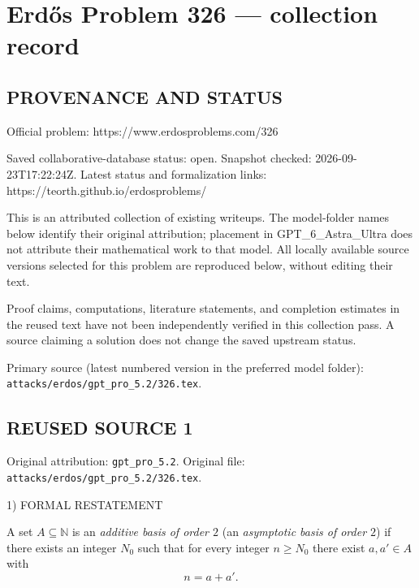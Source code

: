 \section*{Erd\H{o}s Problem 326 --- collection record}

\subsection*{PROVENANCE AND STATUS}
Official problem: https://www.erdosproblems.com/326

Saved collaborative-database status: open.
Snapshot checked: 2026-09-23T17:22:24Z.
Latest status and formalization links: https://teorth.github.io/erdosproblems/

This is an attributed collection of existing writeups. The model-folder names below identify their original attribution; placement in GPT\_6\_Astra\_Ultra does not attribute their mathematical work to that model. All locally available source versions selected for this problem are reproduced below, without editing their text.

Proof claims, computations, literature statements, and completion estimates in the reused text have not been independently verified in this collection pass. A source claiming a solution does not change the saved upstream status.

Primary source (latest numbered version in the preferred model folder): \texttt{attacks/erdos/gpt\_pro\_5.2/326.tex}.

\subsection*{REUSED SOURCE 1}
Original attribution: \texttt{gpt\_pro\_5.2}.
Original file: \texttt{attacks/erdos/gpt\_pro\_5.2/326.tex}.


1) FORMAL RESTATEMENT

A set $A\subseteq\mathbb N$ is an \emph{additive basis of order $2$} (an \emph{asymptotic basis of order $2$}) if there exists an integer $N_0$ such that for every integer $n\ge N_0$ there exist $a,a'\in A$ with
\[
n=a+a'.
\]

